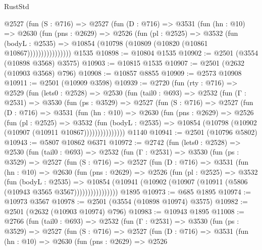 \begin{lexlean}{RustStd}
\begin{coremodule}
              @2527
                (fun (S : @716) =>
                @2527
                  (fun (D : @716) =>
                  @3531
                    (fun (hn : @10) =>
                    @2630
                      (fun (pns : @2629) =>
                      @2526
                        (fun (pl : @2525) =>
                        @3532
                          (fun (bodyL : @2535) =>
                          @10854 (@10798 (@10809 (@10820 (@10861 @10867))))))))))))))))
    @1535
@10898 := @10804 @1535
@10902 := @2501 (@3554 (@10898 @3568) @3575)
@10903 := @10815 @1535
@10907 := @2501 (@2632 (@10903 @3568) @796)
@10908 := @10857 @8855
@10909 := @2573 @10908
@10911 := @2501 (@10909 @3598)
@10939 := @2720
    (fun (rty : @716) =>
    @2529
      (fun (lets0 : @2528) =>
      @2530
        (fun (tail0 : @693) =>
        @2532
          (fun (Γ : @2531) =>
          @3530
            (fun (ps : @3529) =>
            @2527
              (fun (S : @716) =>
              @2527
                (fun (D : @716) =>
                @3531
                  (fun (hn : @10) =>
                  @2630
                    (fun (pns : @2629) =>
                    @2526
                      (fun (pl : @2525) =>
                      @3532
                        (fun (bodyL : @2535) =>
                        @10854 (@10798 (@10902 (@10907 (@10911 @10867)))))))))))))))
    @1140
@10941 := @2501 (@10796 @5802)
@10943 := @5807 @10862 @6371
@10972 := @2742
    (fun (lets0 : @2528) =>
    @2530
      (fun (tail0 : @693) =>
      @2532
        (fun (Γ : @2531) =>
        @3530
          (fun (ps : @3529) =>
          @2527
            (fun (S : @716) =>
            @2527
              (fun (D : @716) =>
              @3531
                (fun (hn : @10) =>
                @2630
                  (fun (pns : @2629) =>
                  @2526
                    (fun (pl : @2525) =>
                    @3532
                      (fun (bodyL : @2535) =>
                      @10854
                        (@10941 (@10902 (@10907 (@10911 (@5806 (@10943 @3565 @3567))))))))))))))))
    @1895
@10973 := @685 @1895
@10974 := @10973 @3567
@10978 := @2501 (@3554 (@10898 @10974) @3575)
@10982 := @2501 (@2632 (@10903 @10974) @796)
@10983 := @10943 @1895
@11008 := @2766
    (fun (tail0 : @693) =>
    @2532
      (fun (Γ : @2531) =>
      @3530
        (fun (ps : @3529) =>
        @2527
          (fun (S : @716) =>
          @2527
            (fun (D : @716) =>
            @3531
              (fun (hn : @10) =>
              @2630
                (fun (pns : @2629) =>
                @2526

\end{coremodule}
\end{lexlean}
